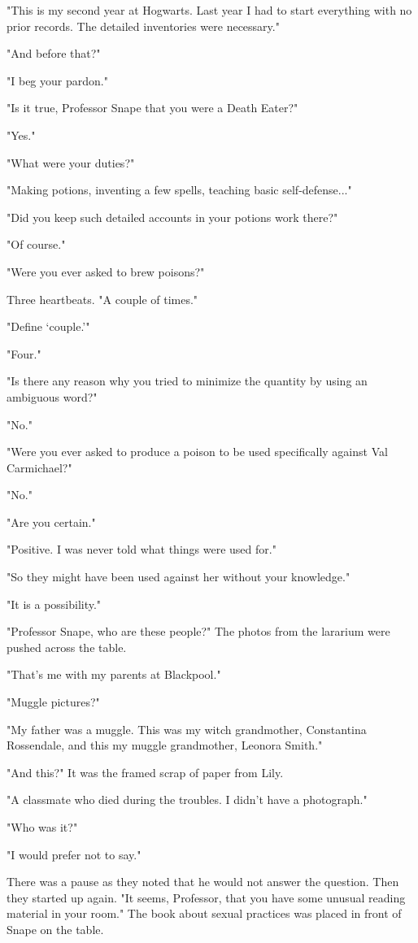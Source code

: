 "This is my second year at Hogwarts. Last year I had to start everything with no prior records. The detailed inventories were necessary."

"And before that?"

"I beg your pardon."

"Is it true, Professor Snape that you were a Death Eater?"

"Yes."

"What were your duties?"

"Making potions, inventing a few spells, teaching basic self-defense..."

"Did you keep such detailed accounts in your potions work there?"

"Of course."

"Were you ever asked to brew poisons?"

Three heartbeats. "A couple of times."

"Define `couple.'"

"Four."

"Is there any reason why you tried to minimize the quantity by using an ambiguous word?"

"No."

"Were you ever asked to produce a poison to be used specifically against Val Carmichael?"

"No."

"Are you certain."

"Positive. I was never told what things were used for."

"So they might have been used against her without your knowledge."

"It is a possibility."

"Professor Snape, who are these people?" The photos from the lararium were pushed across the table.

"That's me with my parents at Blackpool."

"Muggle pictures?"

"My father was a muggle. This was my witch grandmother, Constantina Rossendale, and this my muggle grandmother, Leonora Smith."

"And this?" It was the framed scrap of paper from Lily.

"A classmate who died during the troubles. I didn't have a photograph."

"Who was it?"

"I would prefer not to say."

There was a pause as they noted that he would not answer the question. Then they started up again. "It seems, Professor, that you have some unusual reading material in your room." The book about sexual practices was placed in front of Snape on the table.

